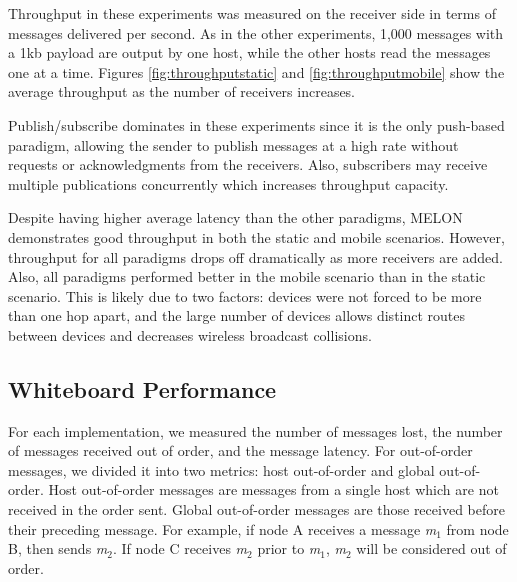 Throughput in these experiments was measured on the receiver side in terms of messages delivered per second. As in the other experiments, 1,000 messages with a 1kb payload are output by one host, while the other hosts read the messages one at a time. Figures \ref{fig:throughputstatic} and \ref{fig:throughputmobile} show the average throughput as the number of receivers increases.

Publish/subscribe dominates in these experiments since it is the only push-based paradigm, allowing the sender to publish messages at a high rate without requests or acknowledgments from the receivers. Also, subscribers may receive multiple publications concurrently which increases throughput capacity.

Despite having higher average latency than the other paradigms, MELON demonstrates good throughput in both the static and mobile scenarios. However, throughput for all paradigms drops off dramatically as more receivers are added. Also, all paradigms performed better in the mobile scenario than in the static scenario. This is likely due to two factors: devices were not forced to be more than one hop apart, and the large number of devices allows distinct routes between devices and decreases wireless broadcast collisions.


\subsection{Whiteboard Performance}\label{sec:whiteboardperformance}

For each implementation, we measured the number of messages lost, the number of messages received out of order, and the message latency. For out-of-order messages, we divided it into two metrics: host out-of-order and global out-of-order. Host out-of-order messages are messages from a single host which are not received in the order sent. Global out-of-order messages are those received before their preceding message. For example, if node A receives a message \textit{m}$_{1}$ from node B, then sends \textit{m}$_{2}$. If node C receives \textit{m}$_{2}$ prior to \textit{m}$_{1}$, \textit{m}$_{2}$ will be considered out of order.

